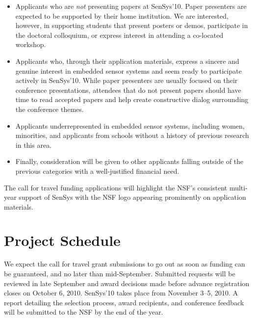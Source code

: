\documentclass[11pt,letterpaper]{article}
\begin{document}
\begin{itemize}

\item Applicants who are \textit{not} presenting papers at SenSys'10. Paper
presenters are expected to be supported by their home institution. We are
interested, however, in supporting students that present posters or demos,
participate in the doctoral colloquium, or express interest in attending a
co-located workshop.

\item Applicants who, through their application materials, express a sincere
and genuine interest in embedded sensor systems and seem ready to participate
actively in SenSys'10. While paper presenters are usually focused on their
conference presentations, attendees that do not present papers should have
time to read accepted papers and help create constructive dialog surrounding
the conference themes.

\item Applicants underrepresented in embedded sensor systems, including
women, minorities, and applicants from schools without a history of previous
research in this area.

\item Finally, consideration will be given to other applicants falling
outside of the previous categories with a well-justified financial need.

\end{itemize}

The call for travel funding applications will highlight the NSF's consistent
multi-year support of SenSys with the NSF logo appearing prominently on
application materials.

\section*{Project Schedule}

We expect the call for travel grant submissions to go out as soon as funding
can be guaranteed, and no later than mid-September. Submitted requests will
be reviewed in late September and award decisions made before advance
registration closes on October 6, 2010. SenSys'10 takes place from November
3--5, 2010. A report detailing the selection process, award recipients, and
conference feedback will be submitted to the NSF by the end of the year.
\end{document}
